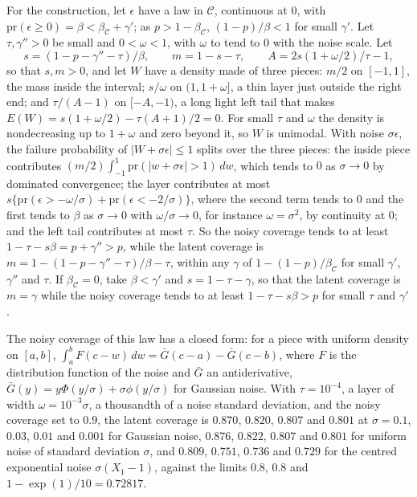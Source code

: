 \documentclass[12pt]{article}
\renewcommand{\_}{\usc\allowbreak}
\theoremstyle{definition}
\numberwithin{equation}{section}
\newcommand{\pr}{\mathrm{pr}}
\newcommand{\E}{\mathcal{C}}
\begin{document}
For the construction, let $\epsilon$ have a law in $\E$, continuous at $0$, with $\pr(\epsilon \ge 0) = \beta < \beta_{\E} + \gamma'$; as $p > 1 - \beta_{\E}$, $(1 - p)/\beta < 1$ for small $\gamma'$. Let $\tau, \gamma'' > 0$ be small and $0 < \omega < 1$, with $\omega$ to tend to $0$ with the noise scale. Let
\[
s = (1 - p - \gamma'' - \tau)/\beta, \qquad m = 1 - s - \tau, \qquad A = 2s(1 + \omega/2)/\tau - 1,
\]
so that $s, m > 0$, and let $W$ have a density made of three pieces: $m/2$ on $[-1, 1]$, the mass inside the interval; $s/\omega$ on $(1, 1 + \omega]$, a thin layer just outside the right end; and $\tau/(A - 1)$ on $[-A, -1)$, a long light left tail that makes $E(W) = s(1 + \omega/2) - \tau(A + 1)/2 = 0$. For small $\tau$ and $\omega$ the density is nondecreasing up to $1 + \omega$ and zero beyond it, so $W$ is unimodal. With noise $\sigma\epsilon$, the failure probability of $|W + \sigma\epsilon| \le 1$ splits over the three pieces: the inside piece contributes $(m/2)\int_{-1}^1\pr(|w + \sigma\epsilon| > 1)\,dw$, which tends to $0$ as $\sigma \to 0$ by dominated convergence; the layer contributes at most $s\{\pr(\epsilon > -\omega/\sigma) + \pr(\epsilon < -2/\sigma)\}$, where the second term tends to $0$ and the first tends to $\beta$ as $\sigma \to 0$ with $\omega/\sigma \to 0$, for instance $\omega = \sigma^2$, by continuity at $0$; and the left tail contributes at most $\tau$. So the noisy coverage tends to at least $1 - \tau - s\beta = p + \gamma'' > p$, while the latent coverage is $m = 1 - (1 - p - \gamma'' - \tau)/\beta - \tau$, within any $\gamma$ of $1 - (1 - p)/\beta_{\E}$ for small $\gamma'$, $\gamma''$ and $\tau$. If $\beta_{\E} = 0$, take $\beta < \gamma'$ and $s = 1 - \tau - \gamma$, so that the latent coverage is $m = \gamma$ while the noisy coverage tends to at least $1 - \tau - s\beta > p$ for small $\tau$ and $\gamma'$.

The noisy coverage of this law has a closed form: for a piece with uniform density on $[a, b]$, $\int_a^b F(c - w)\,dw = \bar G(c - a) - \bar G(c - b)$, where $F$ is the distribution function of the noise and $\bar G$ an antiderivative, $\bar G(y) = y\Phi(y/\sigma) + \sigma\phi(y/\sigma)$ for Gaussian noise. With $\tau = 10^{-4}$, a layer of width $\omega = 10^{-3}\sigma$, a thousandth of a noise standard deviation, and the noisy coverage set to $0.9$, the latent coverage is $0.870$, $0.820$, $0.807$ and $0.801$ at $\sigma = 0.1$, $0.03$, $0.01$ and $0.001$ for Gaussian noise, $0.876$, $0.822$, $0.807$ and $0.801$ for uniform noise of standard deviation $\sigma$, and $0.809$, $0.751$, $0.736$ and $0.729$ for the centred exponential noise $\sigma(X_1 - 1)$, against the limits $0.8$, $0.8$ and $1 - \exp(1)/10 = 0.72817$.
\end{document}
